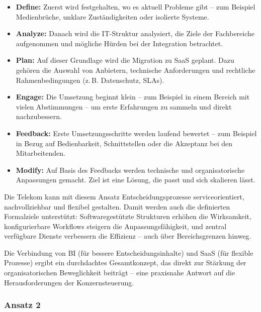 \documentclass[12pt,a4paper]{article}
\begin{document}
\begin{itemize}
	\item \textbf{Define:} Zuerst wird festgehalten, wo es aktuell Probleme gibt – zum Beispiel Medienbrüche, unklare Zuständigkeiten oder isolierte Systeme.
	
	\item \textbf{Analyze:} Danach wird die IT-Struktur analysiert, die Ziele der Fachbereiche aufgenommen und mögliche Hürden bei der Integration betrachtet.
	
	\item \textbf{Plan:} Auf dieser Grundlage wird die Migration zu SaaS geplant. Dazu gehören die Auswahl von Anbietern, technische Anforderungen und rechtliche Rahmenbedingungen (z.\,B. Datenschutz, SLAs).
	
	\item \textbf{Engage:} Die Umsetzung beginnt klein – zum Beispiel in einem Bereich mit vielen Abstimmungen – um erste Erfahrungen zu sammeln und direkt nachzubessern.
	
	\item \textbf{Feedback:} Erste Umsetzungsschritte werden laufend bewertet – zum Beispiel in Bezug auf Bedienbarkeit, Schnittstellen oder die Akzeptanz bei den Mitarbeitenden.
	
	\item \textbf{Modify:} Auf Basis des Feedbacks werden technische und organisatorische Anpassungen gemacht. Ziel ist eine Lösung, die passt und sich skalieren lässt.
\end{itemize}

\noindent Die Telekom kann mit diesem Ansatz Entscheidungsprozesse serviceorientiert, nachvollziehbar und flexibel gestalten. Damit werden auch die definierten Formalziele unterstützt: Softwaregestützte Strukturen erhöhen die Wirksamkeit, konfigurierbare Workflows steigern die Anpassungsfähigkeit, und zentral verfügbare Dienste verbessern die Effizienz – auch über Bereichsgrenzen hinweg.

\noindent Die Verbindung von BI (für bessere Entscheidungsinhalte) und SaaS (für flexible Prozesse) ergibt ein durchdachtes Gesamtkonzept, das direkt zur Stärkung der organisatorischen Beweglichkeit beiträgt – eine praxisnahe Antwort auf die Herausforderungen der Konzernsteuerung.

\subsubsection{Ansatz 2}
\end{document}
